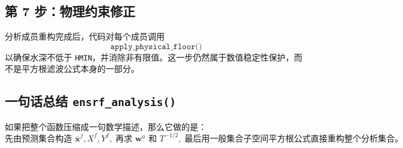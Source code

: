 \documentclass[12pt,a4paper]{article}
\begin{document}
\subsection{第 7 步：物理约束修正}

分析成员重构完成后，代码对每个成员调用
\[
\texttt{apply\_physical\_floor()}
\]
以确保水深不低于 \texttt{HMIN}，并消除非有限值。这一步仍然属于数值稳定性保护，而不是平方根滤波公式本身的一部分。

\subsection{一句话总结 \texttt{ensrf\_analysis()}}

如果把整个函数压缩成一句数学描述，那么它做的是：
\[
\text{先由预测集合构造 } \bar{\mathbf{x}}^f,X^f,Y^f,\;
\text{再求 } \mathbf{w}^a \text{ 和 } T^{-1/2},\;
\text{最后用一般集合子空间平方根公式直接重构整个分析集合。}
\]



\end{document}
